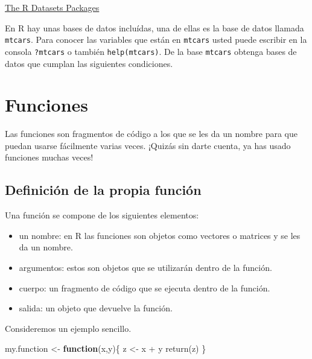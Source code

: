 \documentclass[
]{book}
\newenvironment{Shaded}{\begin{snugshade}}{\end{snugshade}}
\newcommand{\ControlFlowTok}[1]{\textcolor[rgb]{0.13,0.29,0.53}{\textbf{#1}}}
\newcommand{\FunctionTok}[1]{\textcolor[rgb]{0.00,0.00,0.00}{#1}}
\newcommand{\NormalTok}[1]{#1}
\newcommand{\OtherTok}[1]{\textcolor[rgb]{0.56,0.35,0.01}{#1}}
\newcommand{\SpecialCharTok}[1]{\textcolor[rgb]{0.00,0.00,0.00}{#1}}
\begin{document}
\href{https://stat.ethz.ch/R-manual/R-devel/library/datasets/html/00Index.html}{The R Datasets Packages}

En R hay unas bases de datos incluídas, una de ellas es la base de datos llamada \texttt{mtcars}. Para conocer las variables que están en \texttt{mtcars} usted puede escribir en la consola \texttt{?mtcars} o también \texttt{help(mtcars)}. De la base \texttt{mtcars} obtenga bases de datos que cumplan las siguientes condiciones.

\hypertarget{funciones}{%
\chapter{Funciones}\label{funciones}}

Las funciones son fragmentos de código a los que se les da un nombre para que puedan usarse fácilmente varias veces. ¡Quizás sin darte cuenta, ya has usado funciones muchas veces!

\hypertarget{definiciuxf3n-de-la-propia-funciuxf3n}{%
\section{Definición de la propia función}\label{definiciuxf3n-de-la-propia-funciuxf3n}}

Una función se compone de los siguientes elementos:

\begin{itemize}
\item
  un nombre: en R las funciones son objetos como vectores o matrices y se les da un nombre.
\item
  argumentos: estos son objetos que se utilizarán dentro de la función.
\item
  cuerpo: un fragmento de código que se ejecuta dentro de la función.
\item
  salida: un objeto que devuelve la función.
\end{itemize}

Consideremos un ejemplo sencillo.

\begin{Shaded}
\begin{Highlighting}[]
\NormalTok{my.function }\OtherTok{\textless{}{-}} \ControlFlowTok{function}\NormalTok{(x,y)\{}
\NormalTok{                  z }\OtherTok{\textless{}{-}}\NormalTok{ x }\SpecialCharTok{+}\NormalTok{ y}
                  \FunctionTok{return}\NormalTok{(z)}
\NormalTok{\}}
\end{Highlighting}
\end{Shaded}
\end{document}
